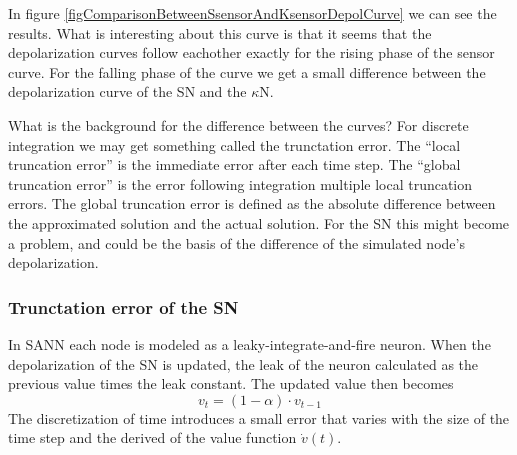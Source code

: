In figure \ref{figComparisonBetweenSsensorAndKsensorDepolCurve} we can see the results. 
What is interesting about this curve is that it seems that the depolarization curves follow eachother exactly %
for the rising phase of the sensor curve. 
For the falling phase of the curve we get a small difference between the depolarization curve of the SN and the $\kappa$N.


What is the background for the difference between the curves?
For discrete integration we may get something called the trunctation error. 
The ``local truncation error'' is the immediate error after each time step. 
The ``global truncation error'' is the error following integration multiple local truncation errors. 
The global truncation error is defined as the absolute difference between the approximated solution and the actual solution. 
For the SN this might become a problem, and could be the basis of the difference of the simulated node's depolarization.%














	\subsubsection{Trunctation error of the SN} %
	\label{ssecTruncationErrorOfSN}
In SANN each node is modeled as a leaky-integrate-and-fire neuron.
When the depolarization of the SN is updated, the leak of the neuron calculated as the previous value times the leak constant.
The updated value then becomes %
\begin{equation}
	v_t =  (1-\alpha) \cdot v_{t-1}  
	\label{eqLekkasjeAnalyseAvTruncationError}
\end{equation}
The discretization of time introduces a small error that varies with the size of the time step and the derived of the value function $\dot{v}(t)$.







